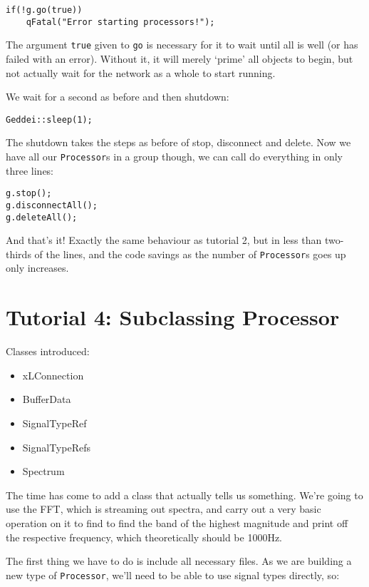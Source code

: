 \begin{verbatim}
if(!g.go(true))
    qFatal("Error starting processors!");
\end{verbatim}

The argument \texttt{true} given to \texttt{go} is necessary for it to wait until all is well (or has failed with an error). Without it, it will merely `prime' all objects to begin, but not actually wait for the network as a whole to start running.

We wait for a second as before and then shutdown:

\begin{verbatim}
Geddei::sleep(1);
\end{verbatim} 

The shutdown takes the steps as before of stop, disconnect and delete. Now we have all our \texttt{Processor}s in a group though, we can call do everything in only three lines:

\begin{verbatim}
g.stop();
g.disconnectAll();
g.deleteAll();
\end{verbatim} 

And that's it! Exactly the same behaviour as tutorial 2, but in less than two-thirds of the lines, and the code savings as the number of \texttt{Processor}s goes up only increases.




\section{Tutorial 4: Subclassing Processor}

Classes introduced:
\begin{itemize}
\item xLConnection
\item BufferData
\item SignalTypeRef
\item SignalTypeRefs
\item Spectrum
\end{itemize}

The time has come to add a class that actually tells us something. We're going to use the FFT, which is streaming out spectra, and carry out a very basic operation on it to find to find the band of the highest magnitude and print off the respective frequency, which theoretically should be 1000Hz.

The first thing we have to do is include all necessary files. As we are building a new type of \texttt{Processor}, we'll need to be able to use signal types directly, so:

